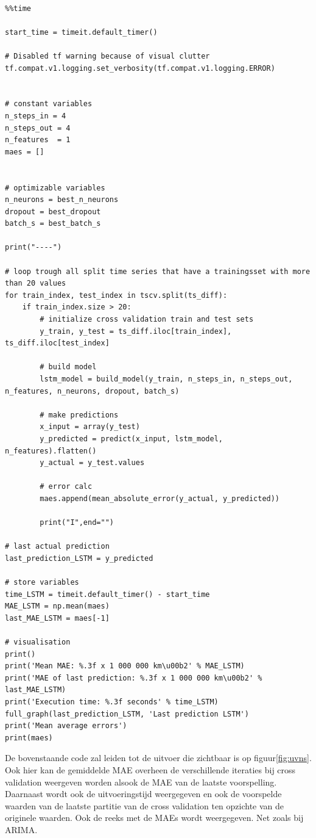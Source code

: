 \begin{verbatim}

%%time

start_time = timeit.default_timer()

# Disabled tf warning because of visual clutter
tf.compat.v1.logging.set_verbosity(tf.compat.v1.logging.ERROR)


# constant variables
n_steps_in = 4
n_steps_out = 4
n_features  = 1
maes = []


# optimizable variables
n_neurons = best_n_neurons
dropout = best_dropout
batch_s = best_batch_s

print("----")

# loop trough all split time series that have a trainingsset with more than 20 values
for train_index, test_index in tscv.split(ts_diff):
    if train_index.size > 20:  
        # initialize cross validation train and test sets
        y_train, y_test = ts_diff.iloc[train_index], ts_diff.iloc[test_index]
        
        # build model
        lstm_model = build_model(y_train, n_steps_in, n_steps_out, n_features, n_neurons, dropout, batch_s)
        
        # make predictions
        x_input = array(y_test)
        y_predicted = predict(x_input, lstm_model, n_features).flatten()
        y_actual = y_test.values
        
        # error calc
        maes.append(mean_absolute_error(y_actual, y_predicted))
        
        print("I",end="")
    
# last actual prediction 
last_prediction_LSTM = y_predicted

# store variables
time_LSTM = timeit.default_timer() - start_time
MAE_LSTM = np.mean(maes)
last_MAE_LSTM = maes[-1]

# visualisation
print()
print('Mean MAE: %.3f x 1 000 000 km\u00b2' % MAE_LSTM)
print('MAE of last prediction: %.3f x 1 000 000 km\u00b2' % last_MAE_LSTM)
print('Execution time: %.3f seconds' % time_LSTM)
full_graph(last_prediction_LSTM, 'Last prediction LSTM')
print('Mean average errors')
print(maes)
\end{verbatim}

De bovenstaande code zal leiden tot de uitvoer die zichtbaar is op figuur\ref{fig:uvns}. Ook hier kan de gemiddelde MAE overheen de verschillende iteraties bij cross validation weergeven worden alsook de MAE van de laatste voorspelling. Daarnaast wordt ook de uitvoeringstijd weergegeven en ook de voorspelde waarden van de laatste partitie van de cross validation ten opzichte van de originele waarden. Ook de reeks met de MAEs wordt weergegeven. Net zoals bij ARIMA.

